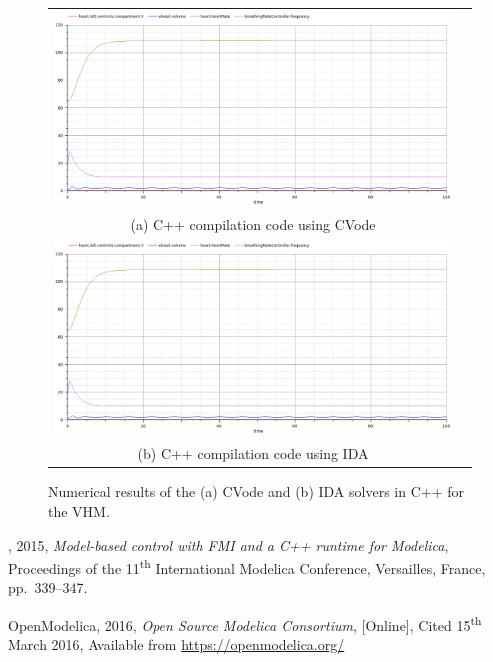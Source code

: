 \documentclass[10pt]{article}
\begin{document}
\begin{figure}[htbp]
\begin{center}
\begin{tabular}{cc}
		\includegraphics[scale=0.45]{CVodeCpp.png}		\\
		\footnotesize(a) {\sf C++} compilation code using CVode	\\
			\includegraphics[scale=0.45]{IdaCpp.png}\\
			\footnotesize(b) {\sf C++} compilation code using IDA\\

	\end{tabular}
\end{center}
\vspace{-0.5cm}

\caption{Numerical results of the (a) CVode and (b) IDA solvers in {\sf C++} for the VHM.} \label{Fig:2}
\end{figure}

{\footnotesize
\begin{thebibliography}{10}

, 2015, {\em Model-based control with FMI and a C++ runtime for Modelica}, Proceedings of the 11\textsuperscript{th} International Modelica Conference, Versailles, France, pp.~339--347.

 {\sc OpenModelica}, 2016, {\em Open Source Modelica Consortium}, [Online], Cited 15\textsuperscript{th} March 2016, Available from {\url{https://openmodelica.org/}}





\end{thebibliography}}
\end{document}
